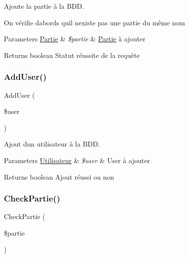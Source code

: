 Ajoute la partie à la B\+DD. 

On vérifie d\textquotesingle{}abords qu\textquotesingle{}il n\textquotesingle{}existe pas une partie du même nom


\begin{DoxyParams}[1]{Parameters}
\mbox{\hyperlink{class_partie}{Partie}} & {\em \$partie} & \mbox{\hyperlink{class_partie}{Partie}} à ajouter\\
\hline
\end{DoxyParams}
\begin{DoxyReturn}{Returns}
boolean Statut réussite de la requète 
\end{DoxyReturn}
\mbox{\label{class_interface_b_d_d_a00c52bf73968bee971285a372892afb6}} 
\subsubsection{\texorpdfstring{Add\+User()}{AddUser()}}
{\footnotesize\ttfamily Add\+User (\begin{DoxyParamCaption}\item[{}]{\$user }\end{DoxyParamCaption})}



Ajout d\textquotesingle{}un utilisateur à la B\+DD. 


\begin{DoxyParams}[1]{Parameters}
\mbox{\hyperlink{class_utilisateur}{Utilisateur}} & {\em \$user} & User à ajouter\\
\hline
\end{DoxyParams}
\begin{DoxyReturn}{Returns}
boolean Ajout réussi ou non 
\end{DoxyReturn}
\mbox{\label{class_interface_b_d_d_a21421b30114a0f7de6e160c048c9506d}} 
\subsubsection{\texorpdfstring{Check\+Partie()}{CheckPartie()}}
{\footnotesize\ttfamily Check\+Partie (\begin{DoxyParamCaption}\item[{}]{\$partie }\end{DoxyParamCaption})}



